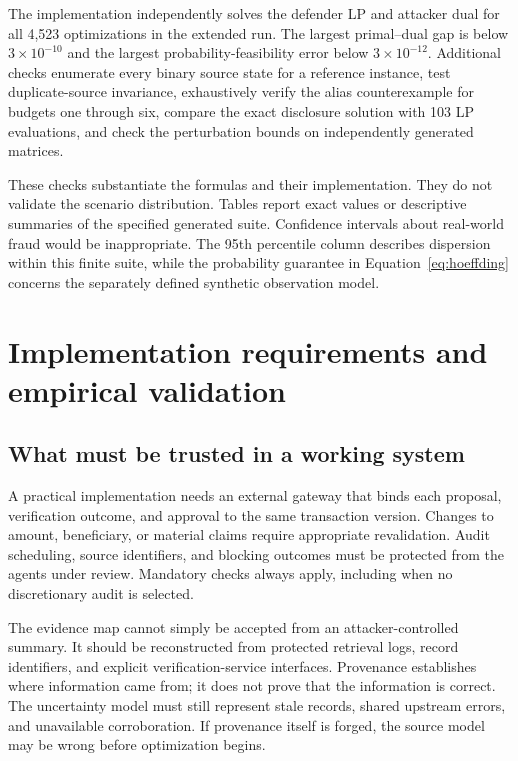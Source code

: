 \documentclass[11pt,letterpaper]{article}
\begin{document}
The implementation independently solves the defender LP and attacker dual for all 4,523 optimizations in the extended run. The largest primal--dual gap is below $3\times10^{-10}$ and the largest probability-feasibility error below $3\times10^{-12}$. Additional checks enumerate every binary source state for a reference instance, test duplicate-source invariance, exhaustively verify the alias counterexample for budgets one through six, compare the exact disclosure solution with 103 LP evaluations, and check the perturbation bounds on independently generated matrices.

These checks substantiate the formulas and their implementation. They do not validate the scenario distribution. Tables report exact values or descriptive summaries of the specified generated suite. Confidence intervals about real-world fraud would be inappropriate. The 95th percentile column describes dispersion within this finite suite, while the probability guarantee in Equation~\ref{eq:hoeffding} concerns the separately defined synthetic observation model.

\section{Implementation requirements and empirical validation}

\subsection{What must be trusted in a working system}

A practical implementation needs an external gateway that binds each proposal, verification outcome, and approval to the same transaction version. Changes to amount, beneficiary, or material claims require appropriate revalidation. Audit scheduling, source identifiers, and blocking outcomes must be protected from the agents under review. Mandatory checks always apply, including when no discretionary audit is selected.

The evidence map cannot simply be accepted from an attacker-controlled summary. It should be reconstructed from protected retrieval logs, record identifiers, and explicit verification-service interfaces. Provenance establishes where information came from; it does not prove that the information is correct. The uncertainty model must still represent stale records, shared upstream errors, and unavailable corroboration. If provenance itself is forged, the source model may be wrong before optimization begins.
\end{document}
